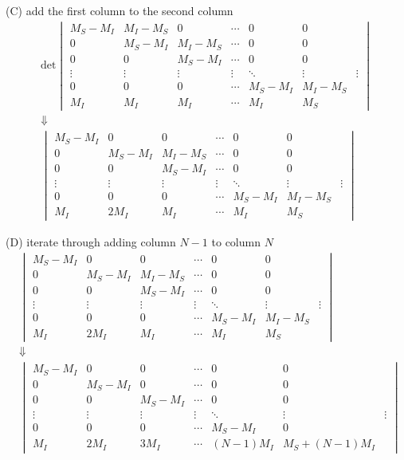 (C) add the first column to the second column
\begin{eqnarray}
&\mathrm{det}
\begin{vmatrix}
M_S-M_I & M_I-M_S & 0       &  \cdots & 0 & 0 \\
0       & M_S-M_I & M_I-M_S &  \cdots & 0 & 0 \\
0 & 0 & M_S-M_I & \cdots & 0 & 0 \\
\vdots & \vdots & \vdots & \vdots & \ddots & \vdots & \vdots \\
0 & 0 & 0 & \cdots & M_S-M_I & M_I-M_S \\
M_I & M_I & M_I & \cdots & M_I & M_S 
\end{vmatrix}&\\
&\Downarrow&\\
&\begin{vmatrix}
M_S-M_I & 0 & 0       &  \cdots & 0 & 0 \\
0       & M_S-M_I & M_I-M_S &  \cdots & 0 & 0 \\
0 & 0 & M_S-M_I & \cdots & 0 & 0 \\
\vdots & \vdots & \vdots & \vdots & \ddots & \vdots & \vdots \\
0 & 0 & 0 & \cdots & M_S-M_I & M_I-M_S \\
M_I & 2M_I & M_I & \cdots & M_I & M_S 
\end{vmatrix}&
\end{eqnarray}

(D) iterate through adding column $N-1$ to column $N$
\begin{eqnarray}
&\begin{vmatrix}
M_S-M_I & 0 & 0       &  \cdots & 0 & 0 \\
0       & M_S-M_I & M_I-M_S &  \cdots & 0 & 0 \\
0 & 0 & M_S-M_I & \cdots & 0 & 0 \\
\vdots & \vdots & \vdots & \vdots & \ddots & \vdots & \vdots \\
0 & 0 & 0 & \cdots & M_S-M_I & M_I-M_S \\
M_I & 2M_I & M_I & \cdots & M_I & M_S 
\end{vmatrix}&\\
&\Downarrow&\\
&\begin{vmatrix}
M_S-M_I & 0 & 0       &  \cdots & 0 & 0 \\
0       & M_S-M_I & 0 &  \cdots & 0 & 0 \\
0 & 0 & M_S-M_I & \cdots & 0 & 0 \\
\vdots & \vdots & \vdots & \vdots & \ddots & \vdots & \vdots \\
0 & 0 & 0 & \cdots & M_S-M_I & 0 \\
M_I & 2M_I & 3M_I & \cdots & (N-1)M_I & M_S +(N-1)M_I
\end{vmatrix}&
\end{eqnarray}

